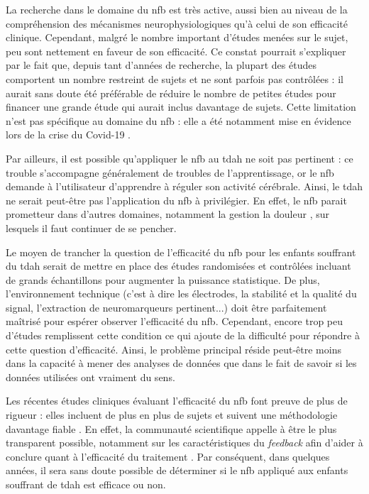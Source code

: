 La recherche dans le domaine du \gls{nfb} est très active, aussi bien au niveau de la compréhension des mécanismes neurophysiologiques 
qu'à celui de son efficacité clinique.
Cependant, malgré le nombre important d'études menées sur le sujet, peu sont nettement en faveur de son efficacité. 
Ce constat pourrait s'expliquer par le fait que, depuis tant d'années de recherche, la plupart des études comportent un nombre
restreint de sujets et ne sont parfois pas contrôlées : il aurait sans doute été préférable de réduire le nombre de petites études pour financer une grande étude
qui aurait inclus davantage de sujets. Cette limitation n'est pas spécifique au domaine du \gls{nfb} : elle a été notamment mise en évidence lors de la crise du 
Covid-19 \citep{Gautret2020, Sanders2020}.

Par ailleurs, il est possible qu'appliquer le \gls{nfb} au \gls{tdah} ne soit pas pertinent : ce trouble s'accompagne généralement de troubles de l'apprentissage,
or le \gls{nfb} demande à l'utilisateur d'apprendre à réguler son activité cérébrale. Ainsi, le \gls{tdah} ne serait peut-être pas l'application du 
\gls{nfb} à privilégier. En effet, le \gls{nfb} parait prometteur dans d'autres domaines, notamment la gestion la douleur \citep{Mayaud2019}, sur lesquels 
il faut continuer de se pencher.

Le moyen de trancher la question de l'efficacité du \gls{nfb} pour les enfants souffrant du \gls{tdah} serait de mettre en place des études randomisées 
et contrôlées incluant de grands échantillons pour augmenter la puissance statistique. De plus, l'environnement technique (c'est à dire 
les électrodes, la stabilité et la qualité du signal, l'extraction de neuromarqueurs pertinent...) doit être parfaitement maîtrisé pour espérer observer
l'efficacité du \gls{nfb}. Cependant, encore trop peu d'études remplissent cette condition ce qui ajoute de la difficulté pour répondre à cette question d'efficacité. 
Ainsi, le problème principal réside peut-être moins dans la capacité à mener des analyses de données que dans le fait de savoir si les données utilisées 
ont vraiment du sens.  

Les récentes études cliniques évaluant l'efficacité du \gls{nfb} 
font preuve de plus de rigueur : elles incluent de plus en plus de sujets et suivent une méthodologie davantage fiable \citep{Bioulac2019}. 
En effet, la communauté scientifique appelle à être le plus transparent possible, notamment sur les caractéristiques du \textit{feedback} afin d'aider à 
conclure quant à l'efficacité du traitement \citep{Ros2019}. Par conséquent, dans quelques années, il sera sans doute possible de déterminer si le \gls{nfb} 
appliqué aux enfants souffrant de \gls{tdah} est efficace ou non.

